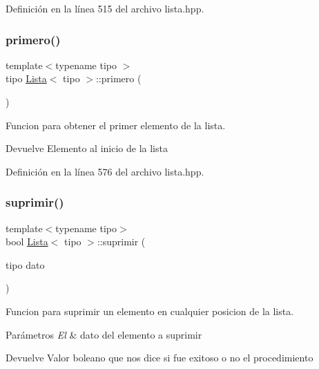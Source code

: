 Definición en la línea 515 del archivo lista.\+hpp.

\mbox{\label{classLista_a7bfb23a36d8476b8731d955bd52b81d5}} 
\subsubsection{\texorpdfstring{primero()}{primero()}}
{\footnotesize\ttfamily template$<$typename tipo $>$ \\
tipo \hyperlink{classLista}{Lista}$<$ tipo $>$\+::primero (\begin{DoxyParamCaption}{ }\end{DoxyParamCaption})}



Funcion para obtener el primer elemento de la lista. 

\begin{DoxyReturn}{Devuelve}
Elemento al inicio de la lista 
\end{DoxyReturn}


Definición en la línea 576 del archivo lista.\+hpp.

\mbox{\label{classLista_a846073e6ce175fa96c6322a4870ddc6d}} 
\subsubsection{\texorpdfstring{suprimir()}{suprimir()}}
{\footnotesize\ttfamily template$<$typename tipo$>$ \\
bool \hyperlink{classLista}{Lista}$<$ tipo $>$\+::suprimir (\begin{DoxyParamCaption}\item[{tipo}]{dato }\end{DoxyParamCaption})}



Funcion para suprimir un elemento en cualquier posicion de la lista. 


\begin{DoxyParams}{Parámetros}
{\em El} & dato del elemento a suprimir \\
\hline
\end{DoxyParams}
\begin{DoxyReturn}{Devuelve}
Valor boleano que nos dice si fue exitoso o no el procedimiento 
\end{DoxyReturn}



